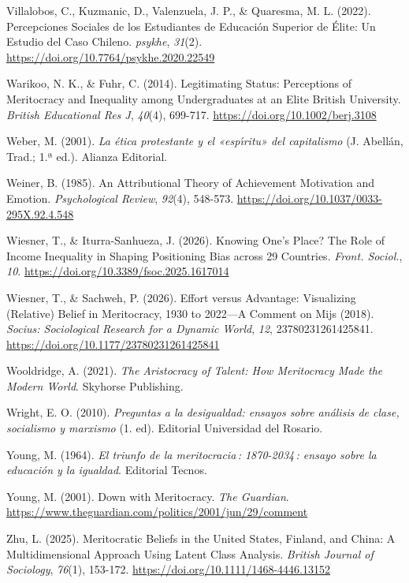 \documentclass[
  spanish,
  a4paper,
  oneside]{scrbook}
\newlength{\cslhangindent}
\newenvironment{CSLReferences}[2] %
 {\begin{list}{}{%
  \setlength{\itemindent}{0pt}
  \setlength{\leftmargin}{0pt}
  \setlength{\parsep}{0pt}
  \ifodd #1
   \setlength{\leftmargin}{\cslhangindent}
   \setlength{\itemindent}{-1\cslhangindent}
  \fi
  \setlength{\itemsep}{#2\baselineskip}}}
 {\end{list}}
\begin{document}
\begin{CSLReferences}{1}{0}
Villalobos, C., Kuzmanic, D., Valenzuela, J. P., \& Quaresma, M. L.
(2022). {Percepciones Sociales de los Estudiantes de Educación Superior
de Élite: Un Estudio del Caso Chileno}. \emph{psykhe}, \emph{31}(2).
\url{https://doi.org/10.7764/psykhe.2020.22549}

Warikoo, N. K., \& Fuhr, C. (2014). Legitimating Status: Perceptions of
Meritocracy and Inequality among Undergraduates at an Elite {British}
University. \emph{British Educational Res J}, \emph{40}(4), 699-717.
\url{https://doi.org/10.1002/berj.3108}

Weber, M. (2001). \emph{{La ética protestante y el {«esp{ı́}ritu»} del
capitalismo}} (J. Abellán, Trad.; 1.ª ed.). Alianza Editorial.

Weiner, B. (1985). An Attributional Theory of Achievement Motivation and
Emotion. \emph{Psychological Review}, \emph{92}(4), 548-573.
\url{https://doi.org/10.1037/0033-295X.92.4.548}

Wiesner, T., \& Iturra-Sanhueza, J. (2026). Knowing One's Place? {The}
Role of Income Inequality in Shaping Positioning Bias across 29
Countries. \emph{Front. Sociol.}, \emph{10}.
\url{https://doi.org/10.3389/fsoc.2025.1617014}

Wiesner, T., \& Sachweh, P. (2026). Effort versus {Advantage}:
{Visualizing} ({Relative}) {Belief} in {Meritocracy}, 1930 to 2022---{A
Comment} on {Mijs} (2018). \emph{Socius: Sociological Research for a
Dynamic World}, \emph{12}, 23780231261425841.
\url{https://doi.org/10.1177/23780231261425841}

Wooldridge, A. (2021). \emph{The Aristocracy of Talent: How Meritocracy
Made the Modern World}. Skyhorse Publishing.

Wright, E. O. (2010). \emph{{Preguntas a la desigualdad: ensayos sobre
análisis de clase, socialismo y marxismo}} (1. ed). Editorial
Universidad del Rosario.

Young, M. (1964). \emph{{El triunfo de la meritocracia : 1870-2034 :
ensayo sobre la educación y la igualdad}}. Editorial Tecnos.

Young, M. (2001). Down with Meritocracy. \emph{The Guardian}.
\url{https://www.theguardian.com/politics/2001/jun/29/comment}

Zhu, L. (2025). Meritocratic Beliefs in the {United States}, {Finland},
and {China}: {A} Multidimensional Approach Using Latent Class Analysis.
\emph{British Journal of Sociology}, \emph{76}(1), 153-172.
\url{https://doi.org/10.1111/1468-4446.13152}

\end{CSLReferences}
\end{document}
